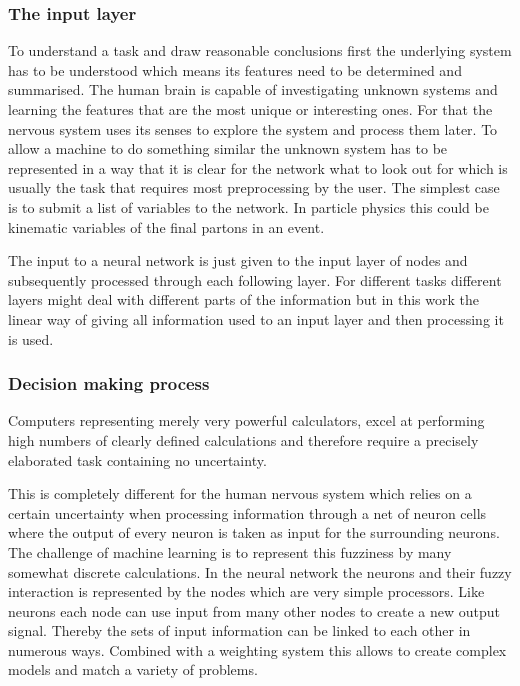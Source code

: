 \subsubsection{The input layer}

To understand a task and draw reasonable conclusions first the underlying system has to be understood which means its features need to be determined and summarised. The human brain is capable of investigating unknown systems and learning the features that are the most unique or interesting ones. For that the nervous system uses its senses to explore the system and process them later. To allow a machine to do something similar the unknown system has to be represented in a way that it is clear for the network what to look out for which is usually the task that requires most preprocessing by the user. The simplest case is to submit a list of variables to the network. In particle physics this could be kinematic variables of the final partons in an event.

The input to a neural network is just given to the input layer of nodes and subsequently processed through each following layer. For different tasks different layers might deal with different parts of the information but in this work the linear way of giving all information used to an input layer and then processing it is used.

\subsubsection{Decision making process}

Computers representing merely very powerful calculators, excel at performing high numbers of clearly defined calculations and therefore require a precisely elaborated task containing no uncertainty.

This is completely different for the human nervous system which relies on a certain uncertainty when processing information through a net of neuron cells where the output of every neuron is taken as input for the surrounding neurons. The challenge of machine learning is to represent this fuzziness by many somewhat discrete calculations. In the neural network the neurons and their fuzzy interaction is represented by the nodes which are very simple processors. Like neurons each node can use input from many other nodes to create a new output signal. Thereby the sets of input information can be linked to each other in numerous ways. Combined with a weighting system this allows to create complex models and match a variety of problems.

